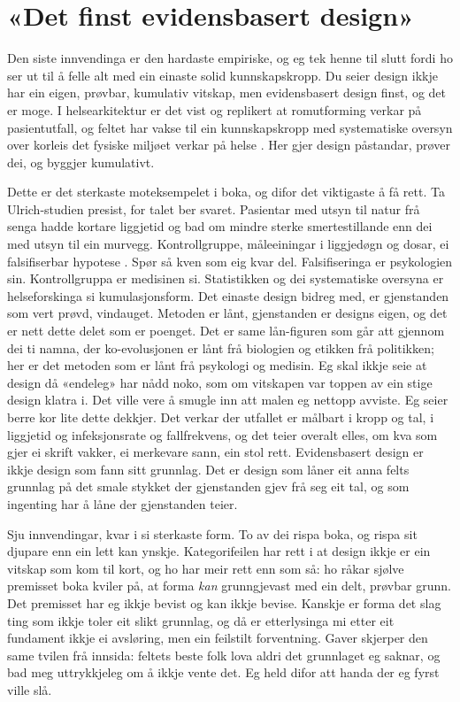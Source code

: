 \section{«Det finst evidensbasert design»}

Den siste innvendinga er den hardaste empiriske, og eg tek henne til slutt fordi ho ser ut til å felle alt med ein einaste solid kunnskapskropp. Du seier design ikkje har ein eigen, prøvbar, kumulativ vitskap, men evidensbasert design finst, og det er moge. I helsearkitektur er det vist og replikert at romutforming verkar på pasientutfall, og feltet har vakse til ein kunnskapskropp med systematiske oversyn over korleis det fysiske miljøet verkar på helse \autocite{ulrich2008ebd}. Her gjer design påstandar, prøver dei, og byggjer kumulativt.

Dette er det sterkaste moteksempelet i boka, og difor det viktigaste å få rett. Ta Ulrich-studien presist, for talet ber svaret. Pasientar med utsyn til natur frå senga hadde kortare liggjetid og bad om mindre sterke smertestillande enn dei med utsyn til ein murvegg. Kontrollgruppe, måleeiningar i liggjedøgn og dosar, ei falsifiserbar hypotese \autocite{ulrich1984view}. Spør så kven som eig kvar del. Falsifiseringa er psykologien sin. Kontrollgruppa er medisinen si. Statistikken og dei systematiske oversyna er helseforskinga si kumulasjonsform. Det einaste design bidreg med, er gjenstanden som vert prøvd, vindauget. Metoden er lånt, gjenstanden er designs eigen, og det er nett dette delet som er poenget. Det er same lån-figuren som går att gjennom dei ti namna, der ko-evolusjonen er lånt frå biologien og etikken frå politikken; her er det metoden som er lånt frå psykologi og medisin. Eg skal ikkje seie at design då «endeleg» har nådd noko, som om vitskapen var toppen av ein stige design klatra i. Det ville vere å smugle inn att malen eg nettopp avviste. Eg seier berre kor lite dette dekkjer. Det verkar der utfallet er målbart i kropp og tal, i liggjetid og infeksjonsrate og fallfrekvens, og det teier overalt elles, om kva som gjer ei skrift vakker, ei merkevare sann, ein stol rett. Evidensbasert design er ikkje design som fann sitt grunnlag. Det er design som låner eit anna felts grunnlag på det smale stykket der gjenstanden gjev frå seg eit tal, og som ingenting har å låne der gjenstanden teier.

\vignett

Sju innvendingar, kvar i si sterkaste form. To av dei rispa boka, og rispa sit djupare enn ein lett kan ynskje. Kategorifeilen har rett i at design ikkje er ein vitskap som kom til kort, og ho har meir rett enn som så: ho råkar sjølve premisset boka kviler på, at forma \emph{kan} grunngjevast med ein delt, prøvbar grunn. Det premisset har eg ikkje bevist og kan ikkje bevise. Kanskje er forma det slag ting som ikkje toler eit slikt grunnlag, og då er etterlysinga mi etter eit fundament ikkje ei avsløring, men ein feilstilt forventning. Gaver skjerper den same tvilen frå innsida: feltets beste folk lova aldri det grunnlaget eg saknar, og bad meg uttrykkjeleg om å ikkje vente det. Eg held difor att handa der eg fyrst ville slå.

